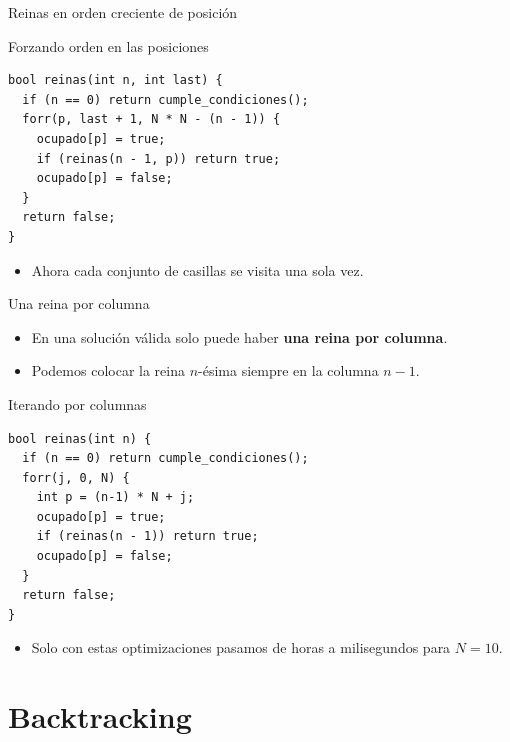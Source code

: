 \documentclass[aspectratio=169]{beamer}
\begin{document}
\begin{frame}[fragile]{Reinas en orden creciente de posición}
  \begin{block}{Forzando orden en las posiciones}
  \begin{lstlisting}[style=customc]
bool reinas(int n, int last) {
  if (n == 0) return cumple_condiciones();
  forr(p, last + 1, N * N - (n - 1)) {
    ocupado[p] = true;
    if (reinas(n - 1, p)) return true;
    ocupado[p] = false;
  }
  return false;
}
  \end{lstlisting}
  \end{block}
  \begin{itemize}
    \item Ahora cada conjunto de casillas se visita una sola vez.
  \end{itemize}
\end{frame}

\begin{frame}[fragile]{Una reina por columna}
  \begin{itemize}
    \item En una solución válida solo puede haber \textbf{una reina por columna}.
    \item Podemos colocar la reina \(n\)-ésima siempre en la columna \(n-1\).
  \end{itemize}
  \begin{block}{Iterando por columnas}
  \begin{lstlisting}[style=customc]
bool reinas(int n) {
  if (n == 0) return cumple_condiciones();
  forr(j, 0, N) {
    int p = (n-1) * N + j;
    ocupado[p] = true;
    if (reinas(n - 1)) return true;
    ocupado[p] = false;
  }
  return false;
}\end{lstlisting}
  \end{block}
  \begin{itemize}
    \item Solo con estas optimizaciones pasamos de horas a milisegundos para \(N = 10\).
  \end{itemize}
\end{frame}

\section{Backtracking}
\end{document}
